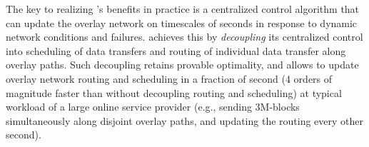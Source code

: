 

The key to realizing \name's benefits in practice is a
centralized control algorithm that can update the overlay network 
on timescales of seconds in response to dynamic network conditions
and failures.
\name achieves this by {\em decoupling} its centralized control 
into scheduling of data transfers and 
routing of individual data transfer along overlay paths.
Such decoupling retains provable optimality, and allows
\name to update overlay network routing and scheduling in a fraction
of second (4 orders of magnitude faster than without decoupling
routing and scheduling) at typical workload
of a large online service provider (e.g., sending \fillme 3M-blocks 
simultaneously along \fillme disjoint overlay paths, and updating 
the routing every other second).


